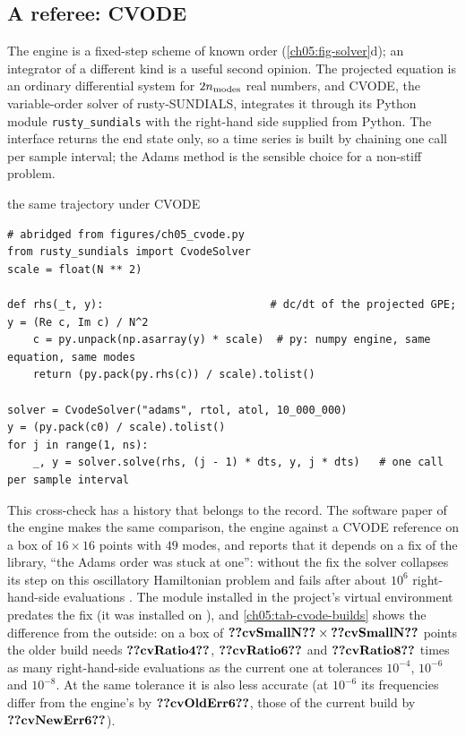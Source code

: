 \subsection{A referee: CVODE}
The engine is a fixed-step scheme of known order (\cref{ch05:fig-solver}d); an integrator of a different kind is a useful second opinion.
The projected equation is an ordinary differential system for $2n_{\rm modes}$ real numbers, and CVODE, the variable-order solver of rusty-SUNDIALS, integrates it through its Python module \texttt{rusty\_sundials} with the right-hand side supplied from Python.
The interface returns the end state only, so a time series is built by chaining one call per sample interval; the Adams method is the sensible choice for a non-stiff problem.
\begin{rustbox}{the same trajectory under CVODE}
\begin{lstlisting}[style=py,basicstyle=\ttfamily\footnotesize]
# abridged from figures/ch05_cvode.py
from rusty_sundials import CvodeSolver
scale = float(N ** 2)

def rhs(_t, y):                          # dc/dt of the projected GPE; y = (Re c, Im c) / N^2
    c = py.unpack(np.asarray(y) * scale)  # py: numpy engine, same equation, same modes
    return (py.pack(py.rhs(c)) / scale).tolist()

solver = CvodeSolver("adams", rtol, atol, 10_000_000)
y = (py.pack(c0) / scale).tolist()
for j in range(1, ns):
    _, y = solver.solve(rhs, (j - 1) * dts, y, j * dts)   # one call per sample interval
\end{lstlisting}
\end{rustbox}
This cross-check has a history that belongs to the record.
The software paper of the engine makes the same comparison, the engine against a CVODE reference on a box of $16\times16$ points with $49$ modes, and reports that it depends on a fix of the library, ``the Adams order was stuck at one'': without the fix the solver collapses its step on this oscillatory Hamiltonian problem and fails after about $10^6$ right-hand-side evaluations \cite{Callens2026sw}.
The module installed in the project's virtual environment predates the fix (it was installed on ), and \cref{ch05:tab-cvode-builds} shows the difference from the outside: on a box of $\cfiveV{cvSmallN}\times\cfiveV{cvSmallN}$ points the older build needs $\cfiveV{cvRatio4}$, $\cfiveV{cvRatio6}$ and $\cfiveV{cvRatio8}$ times as many right-hand-side evaluations as the current one at tolerances $10^{-4}$, $10^{-6}$ and $10^{-8}$.
At the same tolerance it is also less accurate (at $10^{-6}$ its frequencies differ from the engine's by $\cfiveV{cvOldErr6}$, those of the current build by $\cfiveV{cvNewErr6}$).
